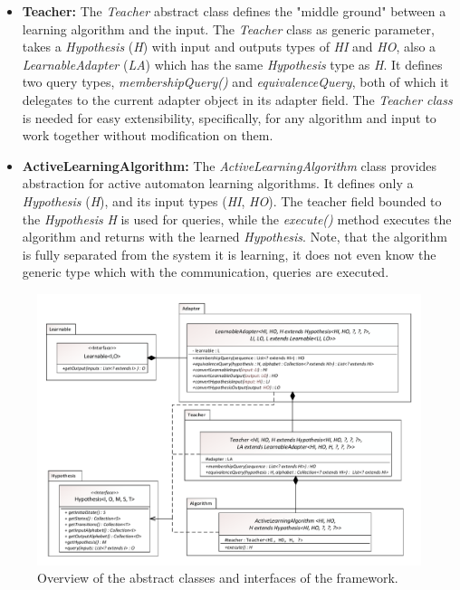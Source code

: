 \begin{itemize}
	\item \textbf{Teacher:} The \emph{Teacher} abstract class defines the "middle ground" between a learning algorithm and the input. The \emph{Teacher} class as generic parameter, takes a \emph{Hypothesis} (\emph{H}) with input and outputs types of \emph{HI} and \emph{HO}, also a \emph{LearnableAdapter} (\emph{LA}) which has the same \emph{Hypothesis} type as \emph{H}. It defines two query types, \emph{membershipQuery()} and \emph{equivalenceQuery}, both of which it delegates to the current adapter object in its adapter field. The \emph{Teacher class} is needed for easy extensibility, specifically, for any algorithm and input to work together without modification on them.
	
	\item \textbf{ActiveLearningAlgorithm:} The \emph{ActiveLearningAlgorithm} class provides abstraction for active automaton learning algorithms. It defines only a \emph{Hypothesis}  (\emph{H}), and its input types (\emph{HI}, \emph{HO}). The teacher field bounded to the \emph{Hypothesis} \emph{H} is used for queries, while the \emph{execute()} method executes the algorithm and returns with the learned \emph{Hypothesis}. Note, that the algorithm is fully separated from the system it is learning, it does not even know the generic type which with the communication, queries are executed.
\end{itemize}


\begin{figure}[H]
	\centering
	\includegraphics[width=0.97\linewidth]{figures/abstractdetailedoverview}
	\caption{Overview of the abstract classes and interfaces of the framework.}
	\label{fig:abstractdetailedoverview}
\end{figure}


